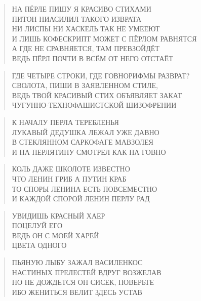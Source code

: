 \poemtitle{***}
\begin{verse}
НА ПЁРЛЕ ПИШУ Я КРАСИВО СТИХАМИ\\
ПИТОН НИАСИЛИЛ ТАКОГО ИЗВРАТА\\
НИ ЛИСПЫ НИ ХАСКЕЛЬ ТАК НЕ УМЕЕЮТ\\
И ЛИШЬ КОФЕСКРИПТ МОЖЕТ С ПЁРЛОМ РАВНЯТСЯ\\
А ГДЕ НЕ СРАВНЯЕТСЯ, ТАМ ПРЕВЗОЙДЁТ\\
ВЕДЬ ПЁРЛ ПОЧТИ В ВСЁМ ОТ НЕГО ОТСТАЁТ
\end{verse}

\poemtitle{***}
\begin{verse}
ГДЕ ЧЕТЫРЕ СТРОКИ, ГДЕ ГОВНОРИФМЫ РАЗВРАТ?\\
СВОЛОТА, ПИШИ В ЗАЯВЛЕННОМ СТИЛЕ,\\
ВЕДЬ ТВОЙ КРАСИВЫЙ СТИХ ОБЪЯВЛЯЕТ ЗАКАТ\\
ЧУГУННО-ТЕХНОФАШИСТСКОЙ ШИЗОФРЕНИИ
\end{verse}

\poemtitle{***}
\begin{verse}
К НАЧАЛУ ПЕРЛА ТЕРЕБЛЕНЬЯ\\
ЛУКАВЫЙ ДЕДУШКА ЛЕЖАЛ УЖЕ ДАВНО\\
В СТЕКЛЯННОМ САРКОФАГЕ МАВЗОЛЕЯ\\
И НА ПЕРЛЯТИНУ СМОТРЕЛ КАК НА ГОВНО
\end{verse}

\poemtitle{***}
\begin{verse}
КОЛЬ ДАЖЕ ШКОЛОТЕ ИЗВЕСТНО\\
ЧТО ЛЕНИН ГРИБ А ПУТИН КРАБ\\
ТО СПОРЫ ЛЕНИНА ЕСТЬ ПОВСЕМЕСТНО\\
И КАЖДОЙ СПОРОЙ ЛЕНИН ПЕРЛУ РАД
\end{verse}

\poemtitle{***}
\begin{verse}
УВИДИШЬ КРАСНЫЙ ХАЕР\\
ПОЦЕЛУЙ ЕГО\\
ВЕДЬ ОН С МОЕЙ ХАРЕЙ\\
ЦВЕТА ОДНОГО
\end{verse}

\poemtitle{***}
\begin{verse}
ПЬЯНУЮ ЛЫБУ ЗАЖАЛ ВАСИЛЕНКОС\\
НАСТИНЫХ ПРЕЛЕСТЕЙ ВДРУГ ВОЗЖЕЛАВ\\
НО НЕ ДОЖДЕТСЯ ОН СИСЕК, ПОВЕРЬТЕ\\
ИБО ЖЕНИТЬСЯ ВЕЛИТ ЗДЕСЬ УСТАВ
\end{verse}

